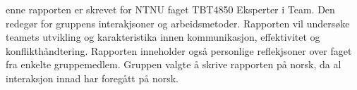 enne rapporten er skrevet for NTNU faget TBT4850 Eksperter i Team. Den redegør for gruppens interakjsoner og arbeidsmetoder. 
Rapporten vil undersøke teamets utvikling og karakteristika innen kommunikasjon, effektivitet og konflikthåndtering. 
Rapporten inneholder også personlige reflekjsoner over faget fra enkelte gruppemedlem. 
Gruppen valgte å skrive rapporten på norsk, da al interaksjon innad har foregått på norsk. 